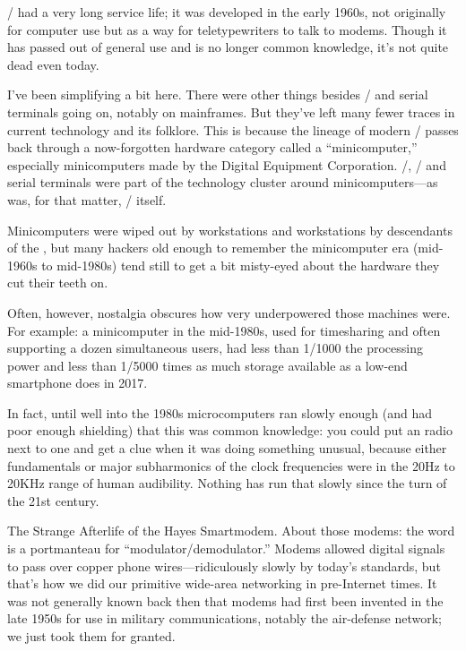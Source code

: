 \RSTTT/ had a very long service life; it was developed in the early 1960s, not
originally for computer use but as a way for teletypewriters to talk to modems.
Though it has passed out of general use and is no longer common knowledge, it's
not quite dead even today.

I've been simplifying a bit here. There were other things besides \RSTTT/ and
serial terminals going on, notably on  mainframes. But they've left many
fewer traces in current technology and its folklore. This is because the
lineage of modern \UNIX/ passes back through a now-forgotten hardware category
called a ``minicomputer,'' especially minicomputers made by the Digital Equipment
Corporation. \ASCII/, \RSTTT/ and serial terminals were part of the technology
cluster around minicomputers---as was, for that matter, \UNIX/ itself.

Minicomputers were wiped out by workstations and workstations by descendants of
the , but many hackers old enough to remember the minicomputer era
(mid-1960s to mid-1980s) tend still to get a bit misty-eyed about the 
hardware they cut their teeth on.

Often, however, nostalgia obscures how very underpowered those machines were.
For example: a  minicomputer in the mid-1980s, used for
timesharing and often supporting a dozen simultaneous users, had less than
1/1000 the processing power and less than 1/5000 times as much storage
available as a low-end smartphone does in 2017.

In fact, until well into the 1980s microcomputers ran slowly enough (and had
poor enough  shielding) that this was common knowledge: you could put an 
radio next to one and get a clue when it was doing something unusual, because
either fundamentals or major subharmonics of the clock frequencies were in the
20Hz to 20KHz range of human audibility. Nothing has run that slowly since the
turn of the 21st century.

\sect The Strange Afterlife of the Hayes Smartmodem.
About those modems: the word is a portmanteau for ``modulator/demodulator.''
Modems allowed digital signals to pass over copper phone wires---ridiculously
slowly by today's standards, but that's how we did our primitive wide-area
networking in pre-Internet times. It was not generally known back then that
modems had first been invented in the late 1950s for use in military
communications, notably the  air-defense network; we just took them for
granted.

